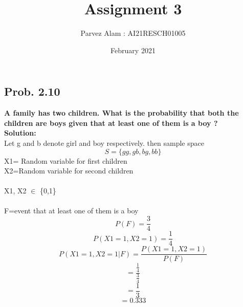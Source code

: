 \documentclass{article}
\title{Assignment 3}
\author{Parvez Alam : AI21RESCH01005 }
\date{February 2021}
\begin{document}
\maketitle
\begin{multicols}{2}
\section{Prob. 2.10}
\textbf{ A family has two children. What is the probability that both the children are boys given that at least one of them is a boy ?} \\
\textbf{Solution:}\\
Let g and b denote girl and boy respectively. then sample space
\[S=\{gg,gb,bg,bb\}\] 
 X1= Random variable for first children \\
 X2=Random variable for second children \\ \\ 
 X1, X2 \( \in\) \{0,1\} \\ \\
 F=event that at least one of them is a boy
\[P(F)=\frac{3}{4}\]
\[P(X1=1 , X2=1)=\frac{1}{4}\]
\[P(X1=1 , X2=1 | F)=\frac{P(X1=1 , X2=1)}{P(F)}\]
\[=\frac{\frac{1}{4}}{\frac{3}{4}}\]
\[=\frac{1}{3}\]
\[=0.333\]


\end{multicols}
\end{document}

